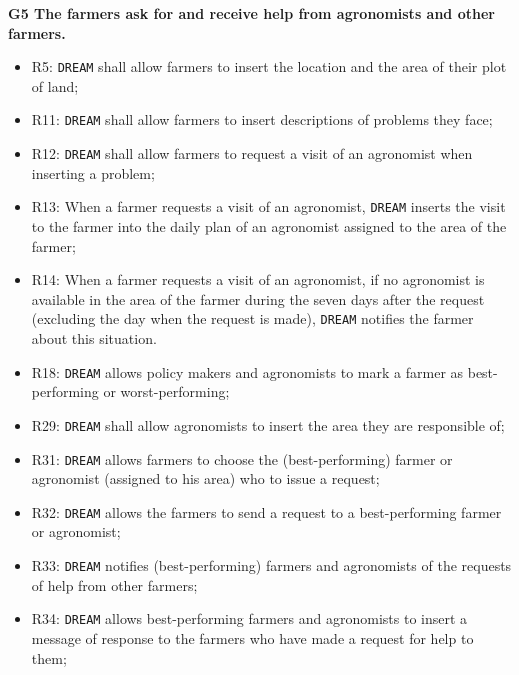 \documentclass{article}
\begin{document}
\vspace{5mm}
\textbf{G5 The farmers ask for and receive help from agronomists and other farmers.}
\begin{itemize}
    \item R5: \verb|DREAM| shall allow farmers to insert the location and the area of their plot of land;
    
    \item R11: \verb|DREAM| shall allow farmers to insert descriptions of problems they face;
    
  \item R12: \verb|DREAM| shall allow farmers to request a visit of an agronomist when inserting a problem;

  \item R13: When a farmer requests a visit of an agronomist, \verb|DREAM| inserts the visit to the farmer into the daily plan of an agronomist assigned to the area of the farmer;

  \item R14: When a farmer requests a visit of an agronomist, if no agronomist is available in the area of the farmer during the seven days after the request (excluding the day when the request is made), \verb|DREAM| notifies the farmer about this situation.
    
    \item R18: \verb|DREAM| allows policy makers and agronomists to mark a farmer as best-performing or worst-performing;
    
    \item R29: \verb|DREAM| shall allow agronomists to insert the area they are responsible of;
  
    \item R31: \verb|DREAM| allows farmers to choose the (best-performing) farmer or agronomist (assigned to his area) who to issue a request;
  
    \item R32: \verb|DREAM| allows the farmers to send a request to a best-performing farmer or agronomist;
    
    \item R33: \verb|DREAM| notifies (best-performing) farmers and agronomists of the requests of help from other farmers;

    \item R34: \verb|DREAM| allows best-performing farmers and agronomists to insert a message of response to the farmers who have made a request for help to them;


\end{itemize}
\end{document}
